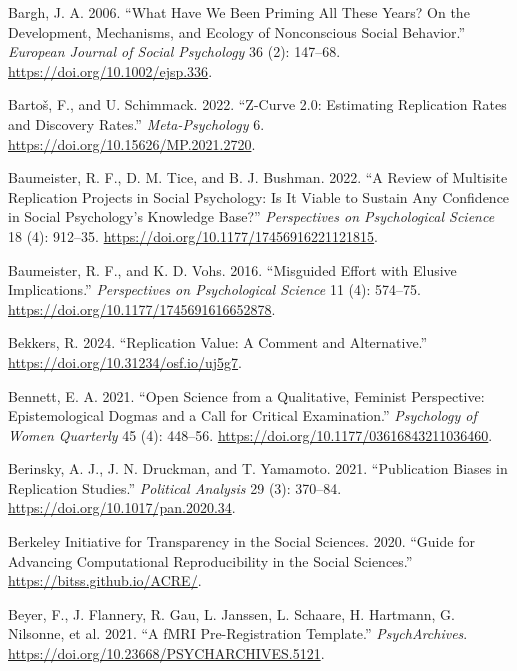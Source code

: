 \documentclass[
  letterpaper,
  DIV=11,
  openany,
  fontsize=12pt,
  parskip=half,
  headings=big,
  numbers=noenddot,
  titlepage=false]{scrreprt}
\newlength{\cslhangindent}
\newenvironment{CSLReferences}[2] %
 {\begin{list}{}{%
  \setlength{\itemindent}{0pt}
  \setlength{\leftmargin}{0pt}
  \setlength{\parsep}{0pt}
  \ifodd #1
   \setlength{\leftmargin}{\cslhangindent}
   \setlength{\itemindent}{-1\cslhangindent}
  \fi
  \setlength{\itemsep}{#2\baselineskip}}}
 {\end{list}}
\begin{document}
\begin{CSLReferences}{1}{0}
Bargh, J. A. 2006. {``What Have We Been Priming All These Years? On the
Development, Mechanisms, and Ecology of Nonconscious Social Behavior.''}
\emph{European Journal of Social Psychology} 36 (2): 147--68.
\url{https://doi.org/10.1002/ejsp.336}.

Bartoš, F., and U. Schimmack. 2022. {``Z-Curve 2.0: Estimating
Replication Rates and Discovery Rates.''} \emph{Meta-Psychology} 6.
\url{https://doi.org/10.15626/MP.2021.2720}.

Baumeister, R. F., D. M. Tice, and B. J. Bushman. 2022. {``A Review of
Multisite Replication Projects in Social Psychology: Is It Viable to
Sustain Any Confidence in Social Psychology's Knowledge Base?''}
\emph{Perspectives on Psychological Science} 18 (4): 912--35.
\url{https://doi.org/10.1177/17456916221121815}.

Baumeister, R. F., and K. D. Vohs. 2016. {``Misguided Effort with
Elusive Implications.''} \emph{Perspectives on Psychological Science} 11
(4): 574--75. \url{https://doi.org/10.1177/1745691616652878}.

Bekkers, R. 2024. {``Replication Value: A Comment and Alternative.''}
\url{https://doi.org/10.31234/osf.io/uj5g7}.

Bennett, E. A. 2021. {``Open Science from a Qualitative, Feminist
Perspective: Epistemological Dogmas and a Call for Critical
Examination.''} \emph{Psychology of Women Quarterly} 45 (4): 448--56.
\url{https://doi.org/10.1177/03616843211036460}.

Berinsky, A. J., J. N. Druckman, and T. Yamamoto. 2021. {``Publication
Biases in Replication Studies.''} \emph{Political Analysis} 29 (3):
370--84. \url{https://doi.org/10.1017/pan.2020.34}.

Berkeley Initiative for Transparency in the Social Sciences. 2020.
{``Guide for Advancing Computational Reproducibility in the Social
Sciences.''} \url{https://bitss.github.io/ACRE/}.

Beyer, F., J. Flannery, R. Gau, L. Janssen, L. Schaare, H. Hartmann, G.
Nilsonne, et al. 2021. {``A fMRI Pre-Registration Template.''}
\emph{PsychArchives}. \url{https://doi.org/10.23668/PSYCHARCHIVES.5121}.


\end{CSLReferences}
\end{document}
